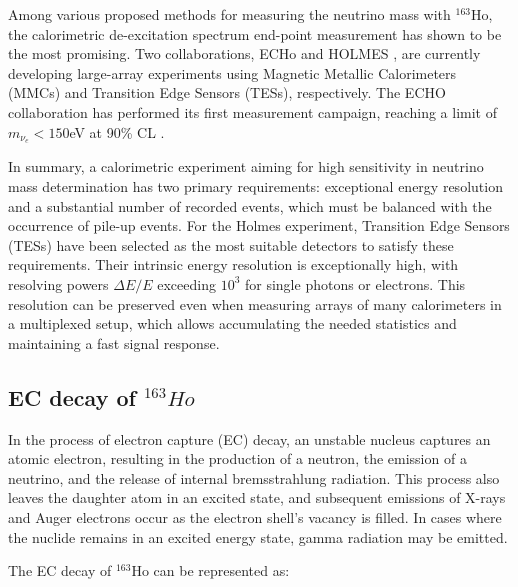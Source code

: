 Among various proposed methods for measuring the neutrino mass with $^{163}$Ho, the calorimetric de-excitation spectrum
end-point measurement has shown to be the most promising.
Two collaborations, ECHo \cite{echofirst} and HOLMES \cite{alpert2015holmes}, are currently developing large-array experiments using Magnetic Metallic
Calorimeters (MMCs) and Transition Edge Sensors (TESs), respectively. The ECHO
collaboration has performed its first measurement campaign, reaching a limit of $m_{\nu_{e}}<150$eV at
90\% CL  \cite{velte2019high}.

In summary, a calorimetric experiment aiming for high sensitivity in neutrino mass determination has two primary
requirements: exceptional energy resolution and a substantial number of recorded events, which must be balanced with the
occurrence of pile-up events. For the Holmes experiment, Transition Edge Sensors (TESs) have been selected as the most
suitable detectors to satisfy these requirements. Their intrinsic energy resolution is exceptionally high, with resolving powers $\Delta E / E$
exceeding $10^3$ for single photons or electrons. This resolution can be preserved even when measuring arrays of
many calorimeters in a multiplexed setup, which allows accumulating the needed statistics and maintaining a fast signal
response.
\subsection{EC decay of $^{163}Ho$}

In the process of electron capture (EC) decay, an unstable nucleus captures an atomic electron, resulting in the production of a neutron, the emission of a neutrino, and the release of internal bremsstrahlung radiation. This process also leaves the daughter atom in an excited state, and subsequent emissions of X-rays and Auger electrons occur as the electron shell's vacancy is filled. In cases where the nuclide remains in an excited energy state, gamma radiation may be emitted. 

The EC decay of $^{163}$Ho can be represented as:


